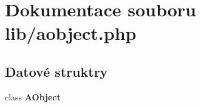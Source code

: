 \section{Dokumentace souboru lib/aobject.php}
\label{df/d8b/aobject_8php}
\subsection*{Datové struktry}
\begin{DoxyCompactItemize}
\item 
class {\bf AObject}
\end{DoxyCompactItemize}
